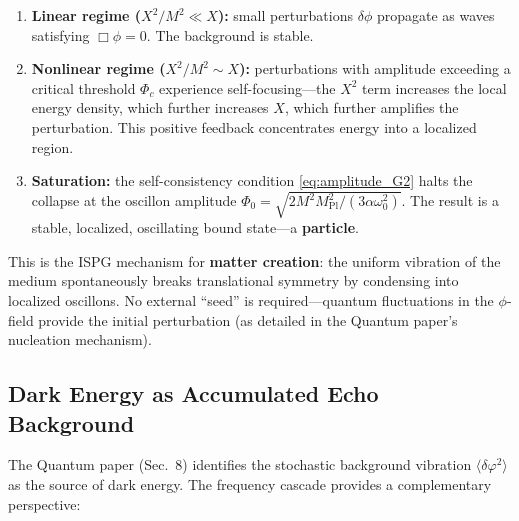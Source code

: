 \documentclass[11pt]{article}
\begin{document}
\begin{enumerate}
  \item \textbf{Linear regime ($X^2/M^2 \ll X$):}
    small perturbations $\delta\phi$ propagate
    as waves satisfying $\Box\phi = 0$.
    The background is stable.

  \item \textbf{Nonlinear regime
    ($X^2/M^2 \sim X$):}
    perturbations with amplitude exceeding a
    critical threshold $\Phi_c$ experience
    self-focusing---the $X^2$ term increases
    the local energy density, which further
    increases $X$, which further amplifies
    the perturbation. This positive feedback
    concentrates energy into a localized region.

  \item \textbf{Saturation:}
    the self-consistency condition
    \eqref{eq:amplitude_G2} halts the collapse
    at the oscillon amplitude
    $\Phi_0 = \sqrt{2M^2 M_{\mathrm{Pl}}^2
    / (3\alpha\omega_0^2)}$.
    The result is a stable, localized,
    oscillating bound state---a \textbf{particle}.
\end{enumerate}

This is the ISPG mechanism for
\textbf{matter creation}: the uniform vibration
of the medium spontaneously breaks translational
symmetry by condensing into localized oscillons.
No external ``seed'' is required---quantum
fluctuations in the $\phi$-field provide the
initial perturbation (as detailed in the Quantum
paper's nucleation mechanism).

\subsection{Dark Energy as Accumulated Echo Background}
\label{sec:dark_energy}

The Quantum paper (Sec.~8) identifies the
stochastic background vibration
$\langle\delta\varphi^2\rangle$ as the source
of dark energy. The frequency cascade provides
a complementary perspective:
\end{document}
